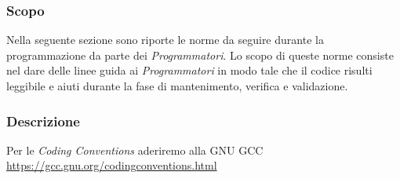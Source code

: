 \documentclass[../NomeDocumento.tex]{subfiles}
\begin{document}
	\subsubsection{Scopo}
	
	Nella seguente sezione sono riporte le norme da seguire durante la programmazione da parte dei \textit{Programmatori}. Lo scopo di queste norme consiste nel dare delle linee guida ai \textit{Programmatori} in modo tale che il codice risulti leggibile e aiuti durante la fase di mantenimento, verifica e validazione.

	\subsubsection{Descrizione}
	
	Per le \emph{Coding Conventions} aderiremo alla GNU GCC \url{https://gcc.gnu.org/codingconventions.html}
	
\end{document}
